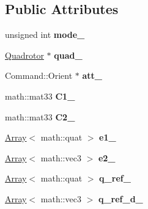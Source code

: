 \subsection*{\-Public \-Attributes}
\begin{DoxyCompactItemize}
\item 
\hypertarget{classAttitude_a0f341afa94379e3eb7619782d33e2690}{unsigned int {\bfseries mode\-\_\-}}\label{classAttitude_a0f341afa94379e3eb7619782d33e2690}

\item 
\hypertarget{classAttitude_a46e4a1fd13d48a7811ca925f8a33d7a3}{\hyperlink{classQuadrotor}{\-Quadrotor} $\ast$ {\bfseries quad\-\_\-}}\label{classAttitude_a46e4a1fd13d48a7811ca925f8a33d7a3}

\item 
\hypertarget{classAttitude_a902c2fc6c510aa1eca73c812854a4531}{\-Command\-::\-Orient $\ast$ {\bfseries att\-\_\-}}\label{classAttitude_a902c2fc6c510aa1eca73c812854a4531}

\item 
\hypertarget{classAttitude_a4551548f9b888cbc3f4a41d102fea01f}{math\-::mat33 {\bfseries \-C1\-\_\-}}\label{classAttitude_a4551548f9b888cbc3f4a41d102fea01f}

\item 
\hypertarget{classAttitude_a6e00c25cca6bf99d4828c96e22dd0f85}{math\-::mat33 {\bfseries \-C2\-\_\-}}\label{classAttitude_a6e00c25cca6bf99d4828c96e22dd0f85}

\item 
\hypertarget{classAttitude_a8117974c86248890c7c7ab6db5c73966}{\hyperlink{classArray}{\-Array}$<$ math\-::quat $>$ {\bfseries e1\-\_\-}}\label{classAttitude_a8117974c86248890c7c7ab6db5c73966}

\item 
\hypertarget{classAttitude_accfe50fd0abccd801da3708cd68e4896}{\hyperlink{classArray}{\-Array}$<$ math\-::vec3 $>$ {\bfseries e2\-\_\-}}\label{classAttitude_accfe50fd0abccd801da3708cd68e4896}

\item 
\hypertarget{classAttitude_aeec79b62c3e4e703e1f902bd989ee0ea}{\hyperlink{classArray}{\-Array}$<$ math\-::quat $>$ {\bfseries q\-\_\-ref\-\_\-}}\label{classAttitude_aeec79b62c3e4e703e1f902bd989ee0ea}

\item 
\hypertarget{classAttitude_a5d15fad5ac2ee69a8b1a306b33d7bcb8}{\hyperlink{classArray}{\-Array}$<$ math\-::vec3 $>$ {\bfseries q\-\_\-ref\-\_\-d\-\_\-}}\label{classAttitude_a5d15fad5ac2ee69a8b1a306b33d7bcb8}


\end{DoxyCompactItemize}
